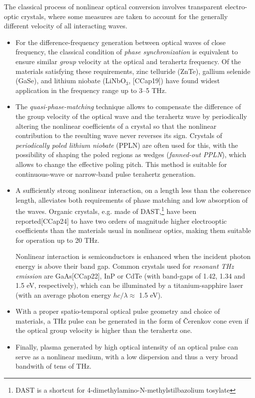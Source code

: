 The classical process of nonlinear optical conversion involves transparent electro-optic crystals, where some measures are taken to account for the generally different velocity of all interacting waves.
\begin{itemize}
\item{For the difference-frequency generation between optical waves of close frequency, the classical condition of \textit{phase synchronization} is equivalent to ensure similar \textit{group} velocity at the optical and terahertz frequency. Of the materials satisfying these requirements, zinc telluride (ZnTe), gallium selenide (GaSe), and lithium niobate (LiNbO$_{3}$, [CCap19]) have found widest application in the frequency range up to 3--5 THz. } 
\item{The \textit{quasi-phase-matching} technique allows to compensate the difference of the group velocity of the optical wave and the terahertz wave by periodically altering the nonlinear coefficients of a crystal so that the nonlinear contribution to the resulting wave never reverses its sign. Crystals of \textit{periodically poled lithium niobate} (PPLN) are often used for this, with the possibility of shaping the poled regions as wedges (\textit{fanned-out PPLN}), which allows to change the effective poling pitch. This method is suitable for continuous-wave or narrow-band pulse terahertz generation.  }  %
\item{A sufficiently strong nonlinear interaction, on a length less than the coherence length, alleviates both requirements of phase matching and low absorption of the waves.\cite{leitenstorfer1999detectors} Organic crystals, e.g. made of DAST,\footnote{DAST is a shortcut for 4-dimethylamino-N-methylstilbazolium tosylate}
have been reported\cite{han2000use}[CCap24]
to have two orders of magnitude higher electrooptic coefficients than the materials usual in nonlinear optics, making them suitable for operation up to 20 THz. 

Nonlinear interaction is semiconductors is enhanced when the incident photon energy is above their band gap. Common crystals used for \textit{resonant THz emission} are GaAs[CCap22], InP  or CdTe (with band-gaps of 1.42, 1.34 and 1.5 eV, respectively), which can be illuminated by a titanium-sapphire laser (with an average photon energy $hc/\lambda \approx$ 1.5 eV).} 
\item{With a proper spatio-temporal optical pulse geometry and choice of materials,\cite{auston1984cherenkov} a THz pulse can be generated in the form of Čerenkov cone even if the optical group velocity is higher than the terahertz one.}
\item{Finally, plasma generated by high optical intensity of an optical pulse can serve as a nonlinear medium, with a low dispersion and thus a very broad bandwith of tens of THz.\cite{loffler2000generation,chen2007terahertz,tong2012} }
 \end{itemize}

